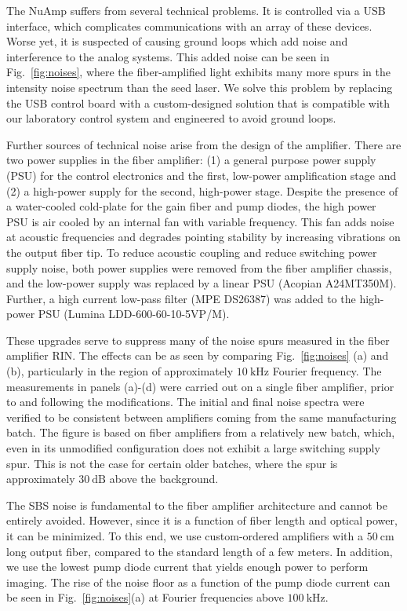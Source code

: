 \documentclass[twocolumn,aps,pra,showpacs,preprintnumbers,bibnotes]{revtex4-1}
\newcommand\unit[2]{\ensuremath{#1~\mathrm{{#2}}}}
\begin{document}
The NuAmp suffers from several technical problems.
It is controlled via a USB interface, which complicates communications with an array of these devices.
Worse yet, it is suspected of causing ground loops which add noise and interference to the analog systems.
This added noise can be seen in Fig.~\ref{fig:noises}, where the fiber-amplified light exhibits many more spurs in the intensity noise spectrum than the seed laser.
We solve this problem by replacing the USB control board with a custom-designed solution  that is compatible with our laboratory control system and engineered to avoid ground loops.


Further sources of technical noise arise from the design of the amplifier. There are two power supplies in the fiber amplifier: (1) a general purpose power supply (PSU) for the control electronics and the first, low-power amplification stage and (2) a high-power supply for the second, high-power stage.
Despite the presence of a water-cooled cold-plate for the gain fiber and pump diodes, the high power PSU is air cooled by an internal fan with variable frequency.
This fan adds noise at acoustic frequencies and degrades pointing stability by increasing vibrations on the output fiber tip.
To reduce acoustic coupling and reduce switching power supply noise, both power supplies were removed from the fiber amplifier chassis, and the low-power supply was replaced by a linear PSU (Acopian A24MT350M).
Further, a high current low-pass filter (MPE DS26387) was added to the high-power PSU (Lumina LDD-600-60-10-5VP/M).


These upgrades serve to suppress many of the noise spurs measured in the fiber amplifier RIN.
The effects can be as seen by comparing Fig.~\ref{fig:noises} (a) and (b), particularly in the region of approximately \unit{10}{kHz} Fourier frequency.
The measurements in panels (a)-(d) were carried out on a single fiber amplifier, prior to and following the modifications. The initial and final noise spectra were verified to be consistent between amplifiers coming from the same manufacturing batch.
The figure is based on fiber amplifiers from a relatively new batch, which, even in its unmodified configuration does not exhibit a large switching supply spur.
This is not the case for certain older batches, where the spur is approximately \unit{30}{dB} above the background.

The SBS noise is fundamental to the fiber amplifier architecture and cannot be entirely avoided. However, since it is a function of fiber length and optical power, it can be minimized. To this end, we use custom-ordered amplifiers with a \unit{50}{cm} long output fiber, compared to the standard length of a few meters.
In addition, we use the lowest pump diode current that yields enough power to perform imaging.
The rise of the noise floor as a function of the pump diode current can be seen in Fig.~\ref{fig:noises}(a) at Fourier frequencies above \unit{100}{kHz}.
\end{document}
